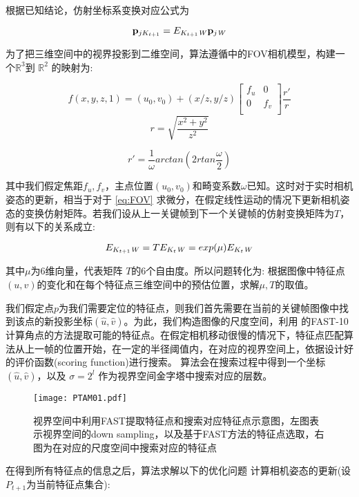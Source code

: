 根据已知结论，仿射坐标系变换对应公式为

\begin{equation}
\mathbf{p}_{jK_{t+1}}= E_{K_{t+1}\mathit{W}} \mathbf{p}_{j\mathit{W}}
\end{equation}

为了把三维空间中的视界投影到二维空间，算法遵循\cite{Klein2007}中的FOV相机模型，构建一个$\mathbb{R}^3$到 $\mathbb{R}^2$ 的映射为:

\begin{equation}
\label{eq:FOV}
f(x,y,z,1)=(u_0,v_0) + (x/z,y/z) 
\begin{bmatrix}
       f_u  & 0 \\
       0 & f_v  \\
\end{bmatrix} \frac{r'}{r}
\end{equation}
\begin{equation}
r= \sqrt{\frac{x^2+y^2}{z^2}}
\end{equation}

\begin{equation}
r'= \frac{1}{\omega} arctan(2rtan\frac{\omega}{2})
\end{equation}

其中我们假定焦距$f_u,f_v$，主点位置$(u_0,v_0)$和畸变系数$\omega$已知。这时对于实时相机姿态的更新，相当于对于 \autoref{eq:FOV} 求微分，在假定线性运动的情况下更新相机姿态的变换仿射矩阵。若我们设从上一关键帧到下一个关键帧的仿射变换矩阵为$T$，则有以下的关系成立:

\begin{equation}
E_{K_{t+1}\mathit{W}}  = T E_{K_{t}\mathit{W}} = exp(\mu) E_{K_{t}\mathit{W}}
\end{equation}

其中$\mu$为6维向量，代表矩阵 $T$的6个自由度。所以问题转化为: 根据图像中特征点$(u,v)$的变化和在每个特征点三维空间中的预估位置，求解$\mu,T$的取值。


我们假定点$p$为我们需要定位的特征点，则我们首先需要在当前的关键帧图像中找到该点的新投影坐标$(\hat{u},\hat{v})$。为此，我们构造图像的尺度空间，利用 %
的FAST-10\cite{Rosten2006}计算角点的方法提取可能的特征点。在假定相机移动很慢的情况下，特征点匹配算法从上一帧的位置开始，在一定的半径阈值内，在对应的视界空间上，依据设计好的评价函数(scoring function)进行搜索。
算法会在搜索过程中得到一个坐标$(\hat{u},\hat{v})$，以及 $\sigma=2^l$ 作为视界空间金字塔中搜索对应的层数。

\begin{figure}[!htbp]
\centering
\texttt{[image: PTAM01.pdf]}
\caption{视界空间中利用FAST提取特征点和搜索对应特征点示意图，左图表示视界空间的down sampling，以及基于FAST方法的特征点选取，右图为在对应的尺度空间中搜索对应的特征点}
\label{fig:PTAM01}
\end{figure}
在得到所有特征点的信息之后，算法求解以下的优化问题
计算相机姿态的更新(设$P_{t+1}$为当前特征点集合):

